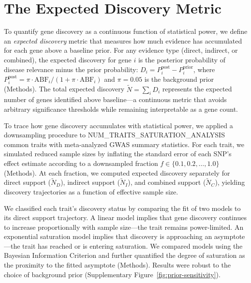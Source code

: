 \section{The Expected Discovery Metric}\label{sec:framework}

To quantify gene discovery as a continuous function of statistical power, we define an \textit{expected discovery} metric that measures how much evidence has accumulated for each gene above a baseline prior. For any evidence type (direct, indirect, or combined), the expected discovery for gene $i$ is the posterior probability of disease relevance minus the prior probability: $D_i = P_i^{\text{post}} - P_i^{\text{prior}}$, where $P_i^{\text{post}} = \pi \cdot \text{ABF}_i / (1 + \pi \cdot \text{ABF}_i)$ and $\pi = 0.05$ is the background prior (Methods). The total expected discovery $\tilde{N} = \sum_i D_i$ represents the expected number of genes identified above baseline---a continuous metric that avoids arbitrary significance thresholds while remaining interpretable as a gene count.

To trace how gene discovery accumulates with statistical power, we applied a downsampling procedure to {{NUM_TRAITS_SATURATION_ANALYSIS}} common traits with meta-analyzed GWAS summary statistics. For each trait, we simulated reduced sample sizes by inflating the standard error of each SNP's effect estimate according to a downsampled fraction $f \in \{0.1, 0.2, \ldots, 1.0\}$ (Methods). At each fraction, we computed expected discovery separately for direct support ($\tilde{N}_D$), indirect support ($\tilde{N}_I$), and combined support ($\tilde{N}_C$), yielding discovery trajectories as a function of effective sample size.

We classified each trait's discovery status by comparing the fit of two models to its direct support trajectory. A linear model implies that gene discovery continues to increase proportionally with sample size---the trait remains power-limited. An exponential saturation model implies that discovery is approaching an asymptote---the trait has reached or is entering saturation. We compared models using the Bayesian Information Criterion and further quantified the degree of saturation as the proximity to the fitted asymptote (Methods). Results were robust to the choice of background prior (Supplementary Figure~\ref{fig:prior-sensitivity}).
